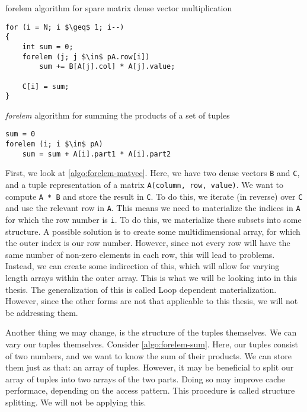 \begin{algorithm}
	\caption{forelem algorithm for spare matrix dense vector multiplication}
	\label{algo:forelem-matvec}
\begin{lstlisting}[mathescape]
for (i = N; i $\geq$ 1; i--)
{
	int sum = 0;
	forelem (j; j $\in$ pA.row[i])
		sum += B[A[j].col] * A[j].value;

	C[i] = sum;
}
\end{lstlisting}
\end{algorithm}

\begin{algorithm}
\caption{\emph{forelem} algorithm for summing the products of a set of tuples}
\label{algo:forelem-sum}
\begin{lstlisting}[mathescape]
sum = 0
forelem (i; i $\in$ pA)
	sum = sum + A[i].part1 * A[i].part2
\end{lstlisting}
\end{algorithm}

First, we look at \autoref{algo:forelem-matvec}. Here, we have two dense vectors \texttt{B} and \texttt{C}, and a tuple representation of a matrix \texttt{A(column, row, value)}. We want to compute \texttt{A * B} and store the result in \texttt{C}. To do this, we iterate (in reverse) over \texttt{C} and use the relevant row in \texttt{A}. This means we need to materialize the indices in \texttt{A} for which the row number is \texttt{i}. To do this, we materialize these subsets into some structure. A possible solution is to create some multidimensional array, for which the outer index is our row number. However, since not every row will have the same number of non-zero elements in each row, this will lead to problems. Instead, we can create some indirection of this, which will allow for varying length arrays within the outer array. This is what we will be looking into in this thesis. The generalization of this is called Loop dependent materialization. However, since the other forms are not that applicable to this thesis, we will not be addressing them.

Another thing we may change, is the structure of the tuples themselves. We can vary our tuples themselves. Consider \autoref{algo:forelem-sum}. Here, our tuples consist of two numbers, and we want to know the sum of their products. We can store them just as that: an array of tuples. However, it may be beneficial to split our array of tuples into two arrays of the two parts. Doing so may improve cache performace, depending on the access pattern. This procedure is called structure splitting. We will not be applying this.

